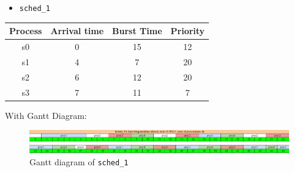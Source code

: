 \documentclass[a4paper]{article}
\numberwithin{equation}{section}
\begin{document}
\begin{itemize}
    \item \texttt{sched_1}
\end{itemize}

\begin{table}[H]
  \centering
  \begin{tabular}{cccc}
    \toprule
    Process & Arrival time & Burst Time & Priority \\
    \midrule
    s0      & 0            & 15         & 12       \\
    s1      & 4            & 7          & 20       \\
    s2      & 6            & 12         & 20       \\
    s3      & 7            & 11         & 7        \\
    \bottomrule
  \end{tabular}
\end{table}

With Gantt Diagram:

\begin{figure}[H]
  \centering
  \includegraphics[width=1\textwidth]{sche1_gantt.png}
  \caption{Gantt diagram of \texttt{sched_1}}
\end{figure}
\end{document}
